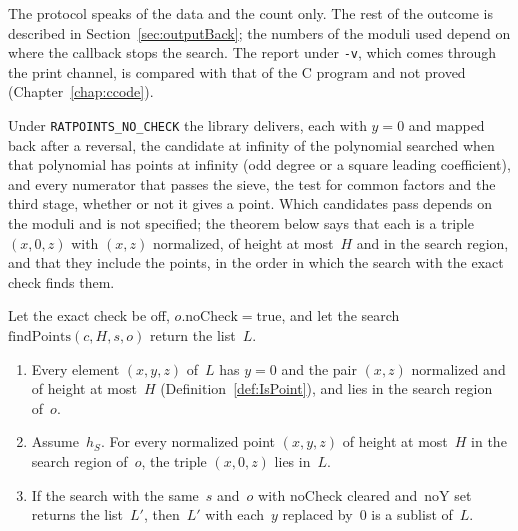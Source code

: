 The protocol speaks of the data and the count only. The rest of the outcome is described in
Section~\ref{sec:outputBack}; the numbers of the moduli used depend on where the callback stops the
search. The report under \verb|-v|, which comes through the print channel, is compared with that of
the C program and not proved (Chapter~\ref{chap:ccode}).

Under \verb|RATPOINTS_NO_CHECK| the library delivers, each with $y = 0$ and mapped back after a
reversal, the candidate at infinity of the polynomial searched when that polynomial has points at
infinity (odd degree or a square leading coefficient), and every numerator that passes the sieve,
the test for common factors and the third stage, whether or not it gives a point. Which candidates
pass depends on the moduli and is not specified; the theorem below says that each is a triple
$(x, 0, z)$ with $(x, z)$ normalized, of height at most~$H$ and in the search region, and that they
include the points, in the order in which the search with the exact check finds them.

\begin{theorem}\label{thm:noCheck}
  \leanok
  Let the exact check be off, $o.\mathrm{noCheck} = \mathrm{true}$, and let the search
  $\mathrm{findPoints}(c, H, s, o)$ return the list~$L$.
  \begin{enumerate}
    \item Every element $(x, y, z)$ of~$L$ has $y = 0$ and the pair $(x, z)$ normalized and of
      height at most~$H$ (Definition~\ref{def:IsPoint}), and lies in the search region of~$o$.
    \item Assume~$h_S$. For every normalized point $(x, y, z)$ of height at most~$H$ in the search
      region of~$o$, the triple $(x, 0, z)$ lies in~$L$.
    \item If the search with the same~$s$ and~$o$ with $\mathrm{noCheck}$ cleared and~$\mathrm{noY}$
      set returns the list~$L'$, then~$L'$ with each~$y$ replaced by~$0$ is a sublist of~$L$.
  \end{enumerate}
\end{theorem}

